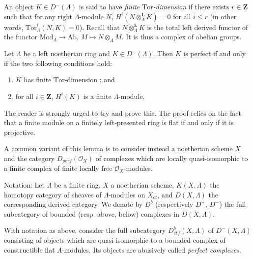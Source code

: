 \begin{definition}
\label{definition-finite-tor-dimension}
An object $K\in D^-(\Lambda)$ is said to have
{\it finite $\text{Tor}$-dimension}
if there exists $r\in \mathbf{Z}$ such that for any
right $\Lambda$-module $N$, $H^i(N\otimes_{\Lambda}^\mathbf{L} K) = 0$ for all
$i \leq r$ (in other words, $\text{Tor}^i_\Lambda (N, K) = 0$). Recall that
$N\otimes^\mathbf{L}_{\Lambda}K$ is the total left derived functor of the
functor $\text{Mod}_{\Lambda} \to \text{Ab}$, $M \mapsto N\otimes_{\Lambda} M$.
It is thus a complex of abelian groups.
\end{definition}

\begin{lemma}
\label{lemma-characterize-perfect}
Let $\Lambda$ be a left noetherian ring and $K\in D^-(\Lambda)$. Then $K$ is
perfect if and only if the two following conditions hold:
\begin{enumerate}
\item
$K$ has finite $\text{Tor}$-dimension ; and
\item
for all $i \in \mathbf{Z}$, $H^i(K)$ is a finite $\Lambda$-module.
\end{enumerate}
\end{lemma}

\noindent
The reader is strongly urged to try and prove this. The proof relies on the
fact that a finite module on a finitely left-presented ring is flat if and only
if it is projective.

\begin{remark}
\label{remark-variant}
A common variant of this lemma is to consider instead a noetherian scheme $X$
and the category $D_{perf}(\mathcal{O}_X)$ of complexes which are locally
quasi-isomorphic to a finite complex of finite locally free
$\mathcal{O}_X$-modules.
\end{remark}

\noindent
Notation: Let $\Lambda$ be a finite ring, $X$ a noetherian scheme,
$K(X, \Lambda)$ the
homotopy category of sheaves of $\Lambda$-modules on $X_{et}$, and
$D(X, \Lambda)$ the corresponding derived category. We denote by $D^b$
(respectively $D^+$, $D^-$) the full subcategory of bounded
(resp. above, below) complexes in $D(X, \Lambda)$.

\begin{definition}
\label{definition-ctf}
With notation as above,
consider the full subcategory $D_{ctf}^b (X, \Lambda)$ of $D^-(X, \Lambda)$
consisting of objects which are quasi-isomorphic to a bounded complex of
constructible flat $\Lambda$-modules. Its objects are abusively called
{\it perfect complexes}.
\end{definition}

